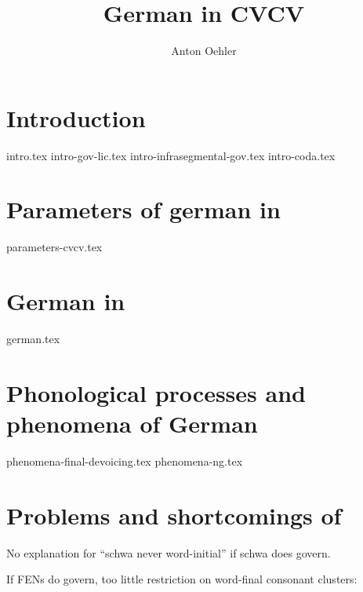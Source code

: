 \documentclass[
]{scrartcl}
\title{German in CVCV}
\author{Anton Oehler}
\begin{document}
\maketitle


\tableofcontents

\section{Introduction}
{intro.tex}
{intro-gov-lic.tex}
{intro-infrasegmental-gov.tex}
{intro-coda.tex}


\section{Parameters of german in \CVCV}
{parameters-cvcv.tex}


\section{German in \CVCV}
{german.tex}


\section{Phonological processes and phenomena of German}
{phenomena-final-devoicing.tex}
{phenomena-ng.tex}

\section{Problems and shortcomings of \CVCV}
No explanation for \enquote{schwa never word-initial} if schwa does govern.

If \glspl{FEN} do govern, too little restriction on word-final consonant
clusters:

\ti{*[Sa:fk]}
\begin{structure}
  \wordstart
  \emptyV
  \fen
\end{structure}
\end{document}
